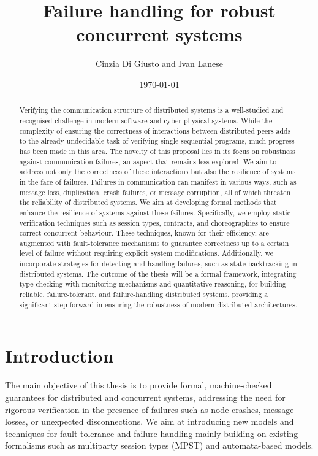 \documentclass{article}
\title{Failure handling for robust concurrent  systems}
\author{Cinzia Di Giusto and Ivan Lanese}
\date{\today}
\theoremstyle{definition}
\theoremstyle{definition}
\begin{document}
\maketitle
\begin{abstract}
Verifying the communication structure of distributed systems is a well-studied and recognised challenge in modern software and cyber-physical systems. While the complexity of ensuring the correctness of interactions between distributed peers adds to the already undecidable task of verifying single sequential programs, much progress has been made in this area. The novelty of this proposal lies in its focus on robustness against communication failures, an aspect that remains less explored. We aim to address not only the correctness of these interactions but also the resilience of systems in the face of failures.
Failures in communication can manifest in various ways, such as message loss, duplication, crash failures, or message corruption, all of which threaten the reliability of distributed systems. We aim at developing formal methods that enhance the resilience of systems against these failures. Specifically, we employ static verification techniques such as session types, contracts, and choreographies to ensure correct concurrent behaviour. These techniques, known for their efficiency, are augmented with fault-tolerance mechanisms to guarantee correctness up to a certain level of failure without requiring explicit system modifications. Additionally, we incorporate strategies for detecting and handling failures, such as state backtracking in distributed systems.
 The outcome of the thesis will be a formal framework, integrating type checking with monitoring mechanisms and quantitative reasoning, for building reliable, failure-tolerant, and failure-handling distributed systems, providing a significant step forward in ensuring the robustness of modern distributed architectures.

\end{abstract}

\section{Introduction}
The main objective of this thesis is to provide formal, machine-checked guarantees for distributed and concurrent systems, addressing the need for rigorous verification in the presence of failures such as node crashes, message losses, or unexpected disconnections. We aim at introducing new models and techniques for fault-tolerance and failure handling mainly building on existing formalisms such as multiparty session types (MPST) and automata-based models.
\end{document}

